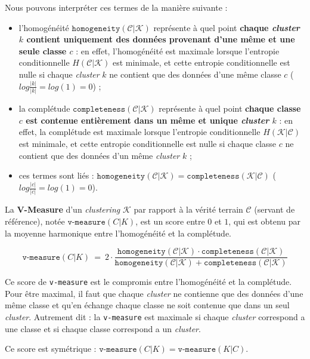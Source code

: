 		\begin{leftBarAuthorOpinion}
			Nous pouvons interpréter ces termes de la manière suivante :
			\begin{itemize}
				\item l'homogénéité $\texttt{homogeneity}(\mathcal{C}|\mathcal{K})$ représente à quel point \textbf{chaque \textit{cluster} $k$ contient uniquement des données provenant d'une même et une seule classe $c$} :
				en effet, l'homogénéité est maximale lorsque l'entropie conditionnelle $H(\mathcal{C}|\mathcal{K})$ est minimale, et cette entropie conditionnelle est nulle si chaque \textit{cluster} $k$ ne contient que des données d'une même classe $c$ ($log \frac{|k|}{|k|}=log(1)=0$) ;
				\item la complétude $\texttt{completeness}(\mathcal{C}|\mathcal{K})$ représente à quel point \textbf{chaque classe $c$ est contenue entièrement dans un même et unique \textit{cluster} $k$} :
				en effet, la complétude est maximale lorsque l'entropie conditionnelle $H(\mathcal{K}|\mathcal{C})$ est minimale, et cette entropie conditionnelle est nulle si chaque classe $c$ ne contient que des données d'un même \textit{cluster} $k$ ;
				\item ces termes sont liés : $\texttt{homogeneity}(\mathcal{C}|\mathcal{K}) = \texttt{completeness}(\mathcal{K}|\mathcal{C})$ ($log \frac{|c|}{|c|}=log(1)=0$).
			\end{itemize}
		\end{leftBarAuthorOpinion}
		
		
		La \textbf{V-Measure} d'un \textit{clustering} $\mathcal{K}$ par rapport à la vérité terrain $\mathcal{C}$ (servant de référence), notée $\texttt{v-measure}(C|K)$, est un score entre $0$ et $1$, qui est obtenu par la moyenne harmonique entre l'homogénéité et la complétude.
		
		\begin{equation}
			\label{equation:D.1-ANNEXE-EVALUATION-CLUSTERING-DEFINITION-VMEASURE}
			\texttt{v-measure}(C|K)~=~2 \cdot \frac{
				\texttt{homogeneity}(\mathcal{C}|\mathcal{K}) \cdot \texttt{completeness}(\mathcal{C}|\mathcal{K})
			}{
				\texttt{homogeneity}(\mathcal{C}|\mathcal{K}) + \texttt{completeness}(\mathcal{C}|\mathcal{K})
			}
		\end{equation}
		
		\begin{leftBarAuthorOpinion}
			Ce score de \texttt{v-measure} est le compromis entre l'homogénéité et la complétude.
			Pour être maximal, il faut que chaque \textit{cluster} ne contienne que des données d'une même classe et qu'en échange chaque classe ne soit contenue que dans un seul \textit{cluster}.
			Autrement dit : la \texttt{v-measure} est maximale si chaque \textit{cluster} correspond a une classe et si chaque classe correspond a un \textit{cluster}.
			
			Ce score est symétrique : $\texttt{v-measure}(C|K) = \texttt{v-measure}(K|C)$.
		\end{leftBarAuthorOpinion}

